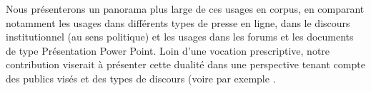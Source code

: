 Nous présenterons un panorama plus large de ces usages en corpus, en comparant notamment les usages dans différents types de presse en ligne, dans le discours institutionnel (au sens politique) et les usages dans les forums et les documents de type \og Présentation Power Point\fg . Loin d'une vocation prescriptive, notre contribution viserait à présenter cette dualité dans une perspective tenant compte des publics visés et des types de discours (voire par exemple \cite{Salvador-2017}.



